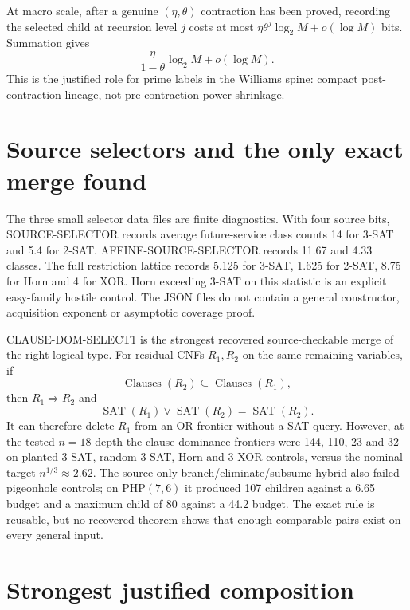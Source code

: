 \documentclass[11pt]{article}
\newcommand{\SAT}{\operatorname{SAT}}
\begin{document}
At macro scale, after a genuine $(\eta,\theta)$ contraction has been proved,
recording the selected child at recursion level $j$ costs at most
$\eta\theta^j\log_2M+o(\log M)$ bits.  Summation gives
\[
        \frac{\eta}{1-\theta}\log_2M+o(\log M).
\]
This is the justified role for prime labels in the Williams spine: compact
post-contraction lineage, not pre-contraction power shrinkage.

\section{Source selectors and the only exact merge found}

The three small selector data files are finite diagnostics.  With four source
bits, SOURCE-SELECTOR records average future-service class counts 14 for 3-SAT
and 5.4 for 2-SAT.  AFFINE-SOURCE-SELECTOR records 11.67 and 4.33 classes.  The
full restriction lattice records 5.125 for 3-SAT, 1.625 for 2-SAT, 8.75 for
Horn and 4 for XOR.  Horn exceeding 3-SAT on this statistic is an explicit
easy-family hostile control.  The JSON files do not contain a general
constructor, acquisition exponent or asymptotic coverage proof.

CLAUSE-DOM-SELECT1 is the strongest recovered source-checkable merge of the
right logical type.  For residual CNFs $R_1,R_2$ on the same remaining
variables, if
\[
       \operatorname{Clauses}(R_2)
       \subseteq \operatorname{Clauses}(R_1),
\]
then $R_1\Rightarrow R_2$ and
\[
       \SAT(R_1)\lor\SAT(R_2)=\SAT(R_2).
\]
It can therefore delete $R_1$ from an OR frontier without a SAT query.
However, at the tested $n=18$ depth the clause-dominance frontiers were 144,
110, 23 and 32 on planted 3-SAT, random 3-SAT, Horn and 3-XOR controls, versus
the nominal target $n^{1/3}\approx2.62$.  The source-only
branch/eliminate/subsume hybrid also failed pigeonhole controls; on PHP$(7,6)$
it produced 107 children against a 6.65 budget and a maximum child of 80
against a 44.2 budget.  The exact rule is reusable, but no recovered theorem
shows that enough comparable pairs exist on every general input.

\section{Strongest justified composition}
\end{document}
